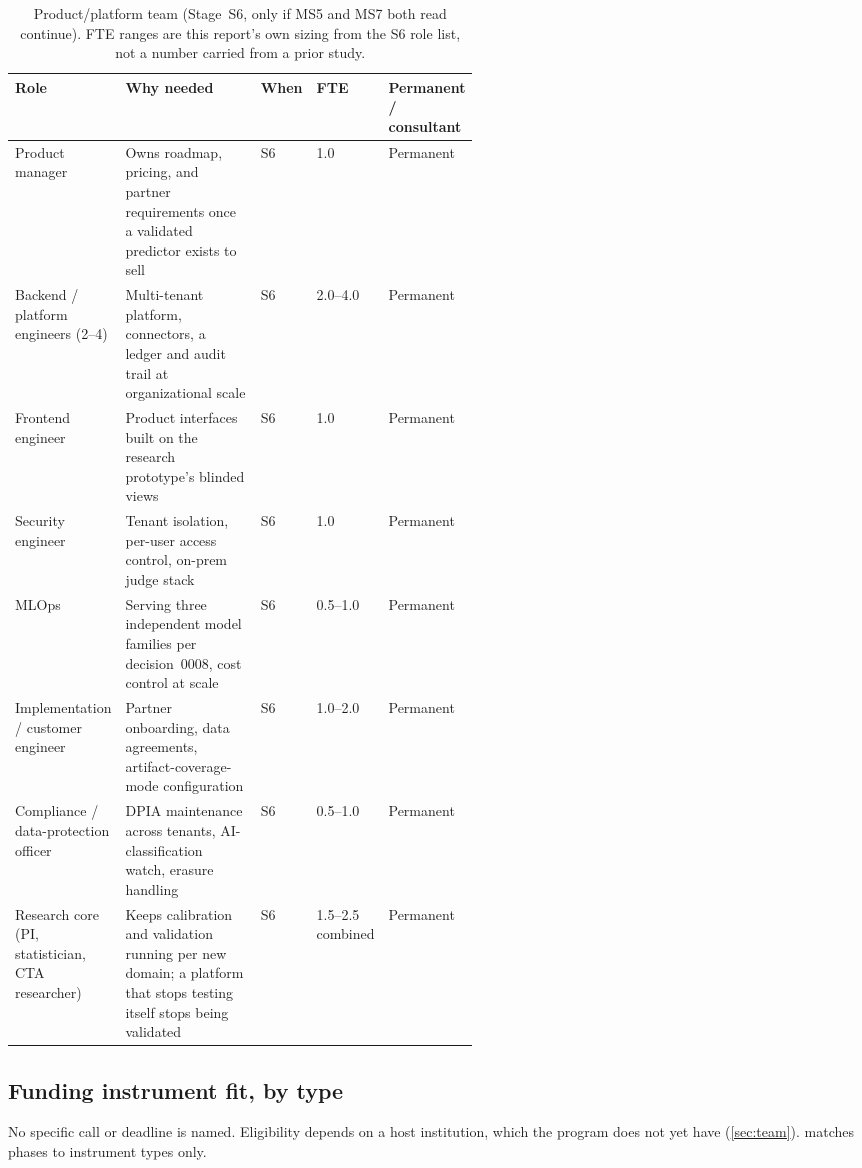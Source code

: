\begin{table}[htbp]
  \centering
  \small
  \caption{Product/platform team (Stage~S6, only if MS5 and MS7 both read continue). FTE ranges
    are this report's own sizing from the S6 role list, not a number carried from a prior study.}
  \label{tab:team-product}
  \begin{tabularx}{\linewidth}{@{}p{0.22\linewidth}Xp{0.12\linewidth}p{0.08\linewidth}p{0.12\linewidth}@{}}
    \toprule
    Role & Why needed & When & FTE & Permanent / consultant \\
    \midrule
    Product manager &
      Owns roadmap, pricing, and partner requirements once a validated
      predictor exists to sell & S6 & 1.0 & Permanent \\
    Backend / platform engineers (2--4) &
      Multi-tenant platform, connectors, a ledger and audit trail at
      organizational scale & S6 & 2.0--4.0 & Permanent \\
    Frontend engineer &
      Product interfaces built on the research prototype's blinded views &
      S6 & 1.0 & Permanent \\
    Security engineer &
      Tenant isolation, per-user access control, on-prem judge stack &
      S6 & 1.0 & Permanent \\
    MLOps &
      Serving three independent model families per decision~0008, cost
      control at scale & S6 & 0.5--1.0 & Permanent \\
    Implementation / customer engineer &
      Partner onboarding, data agreements, artifact-coverage-mode
      configuration & S6 & 1.0--2.0 & Permanent \\
    Compliance / data-protection officer &
      DPIA maintenance across tenants, AI-classification watch, erasure
      handling & S6 & 0.5--1.0 & Permanent \\
    Research core (PI, statistician, CTA researcher) &
      Keeps calibration and validation running per new domain; a platform
      that stops testing itself stops being validated & S6 & 1.5--2.5
      combined & Permanent \\
    \bottomrule
  \end{tabularx}
\end{table}

\subsection{Funding instrument fit, by type}

No specific call or deadline is named. Eligibility depends on a host institution, which the
program does not yet have (\cref{sec:team}). \evfut{}  matches
phases to instrument types only.

